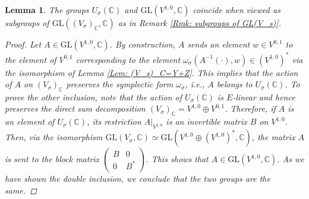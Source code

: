 \documentclass[11pt,twoside,a4paper]{amsart}
\newcommand{\0}{\mathscr{O}}
\newcommand{\C}{\mathbb{C}}
\newcommand{\s}{\sigma}
\theoremstyle{plain}
\newtheorem{lem}[thm]{Lemma}
\theoremstyle{definition}
\theoremstyle{remark}
\begin{document}
\begin{lem}
\label{Lem: the action of S}
The groups $U_\s(\C)$ and $\mathrm{GL}(V^{1,0},\C)$ coincide when viewed as subgroups of $\mathrm{GL}((V_\s)_\C,\C)$ as in Remark \ref{Rmk: subgroups of GL(V_s)}.
\begin{proof}
Let $A\in \mathrm{GL}(V^{1,0},\C)$. By construction, $A$ sends an element $w\in V^{0,1}$ to the element of $V^{0,1}$ corresponding to the element $\omega_\s(A^{-1}(\cdot),w)\in (V^{1,0})^*$ via the isomorphism of Lemma \ref{Lem: (V_s)_C=Y+Z}. This implies that the action of $A$ on $(V_\s)_\C$ preserves the symplectic form $\omega_\s$, i.e., $A$ belongs to $U_\s(\C)$. To prove the other inclusion, note that the action of $U_\s(\C)$ is $E$-linear and hence preserves the direct sum decomposition $(V_\s)_\C=V^{1,0}\oplus V^{0,1}$.
Therefore, if $A$ is an element of $U_\s(\C)$, its restriction $A|_{V^{1,0}}$ is an invertible matrix $B$ on $V^{1,0}$. Then, via the isomorphism $\mathrm{GL}(V_\s,\C)\simeq \mathrm{GL}(V^{1,0}\oplus(V^{1,0})^*,\C)$, the matrix $A$ is sent to the block matrix 
$\begin{pmatrix}
B & 0\\
0 & B^*
\end{pmatrix}.
$
This shows that $A\in\mathrm{GL}(V^{1,0},\C)$. As we have shown the double inclusion, we conclude that the two groups are the same.
\end{proof}
\end{lem}
\end{document}
